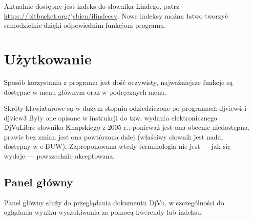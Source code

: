 \documentclass{mwart}
\begin{document}
Aktualnie dostępny jest indeks do słownika Lindego, patrz
\url{https://bitbucket.org/jsbien/ilindecsv}. Nowe indeksy można łatwo
tworzyć samodzielnie dzięki odpowiednim funkcjom programu. 

\section{Użytkowanie}
\label{sec:uytkowanie}

Sposób korzystania z programu jest dość oczywisty, najważniejsze
funkcje są dostępne w menu głównym oraz w podręcznych menu.

Skróty klawiaturowe są w dużym stopniu odziedziczone po programach
\textsf{djview4} i \textsf{djview3} Były one opisane w instrukcji do
tzw. wydania elektronicznego DjVuLibre słownika Knapskiego z 2005 r.;
ponieważ jest ona obecnie niedostępna, prawie bez zmian jest ona
powtórzona dalej (właściwy słownik jest nadal dostępny w e-BUW).
Zaproponowana wtedy terminologia nie jest --- jak się wydaje ---
powszechnie akceptowana.

\subsection{Panel główny}
\label{sec:panel-gowny}

Panel główny służy do przeglądania dokumentu DjVu, w szczególności do
oglądania wyniku wyszukiwania za pomocą kwerendy lub indeksu.
\end{document}

